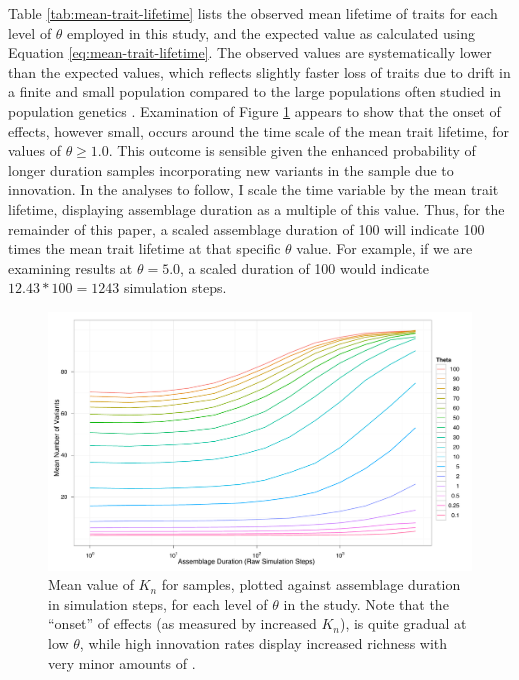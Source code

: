 Table \ref{tab:mean-trait-lifetime} lists the observed mean lifetime of traits for each level of $\theta$ employed in this study, and the expected value as calculated using Equation \ref{eq:mean-trait-lifetime}.  The observed values are systematically lower than the expected values, which reflects slightly faster loss of traits due to drift in a finite and small population compared to the large populations often studied in population genetics \citep{ewens1964maintenance,kimura1964number}.  Examination of Figure \ref{fig:unscaled_kn} appears to show that the onset of \timeav effects, however small, occurs around the time scale of the mean trait lifetime, for values of $\theta \geq 1.0$.  This outcome is sensible given the enhanced probability of longer duration samples incorporating new variants in the sample due to innovation.  In the analyses to follow, I scale the time variable by the mean trait lifetime, displaying assemblage duration as a multiple of this value.  Thus, for the remainder of this paper, a scaled assemblage duration of 100 will indicate 100 times the mean trait lifetime at that specific $\theta$ value.  For example, if we are examining results at $\theta = 5.0$, a scaled duration of 100 would indicate $12.43 * 100 = 1243$ simulation steps.  

\begin{figure}
	\includegraphics[angle=90, scale=0.75]{graphics/timeaveraging/unscaled_kn_by_duration_stacked.pdf}
	\caption{Mean value of $K_n$ for \timeavd samples, plotted against assemblage duration in simulation steps, for each level of $\theta$ in the study.  Note that the ``onset'' of \timeav effects (as measured by increased $K_n$), is quite gradual at low $\theta$, while high innovation rates display increased richness with very minor amounts of \timeav.}
	\label{fig:unscaled_kn}
\end{figure}

